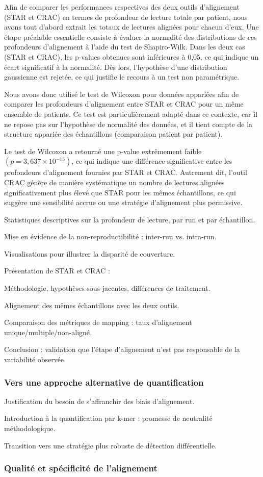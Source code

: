 Afin de comparer les performances respectives des deux outils d’alignement (STAR et CRAC) en termes de profondeur de lecture totale par patient,
 nous avons tout d’abord extrait les totaux de lectures alignées pour chacun d’eux.
Une étape préalable essentielle consiste à évaluer la normalité des distributions de ces profondeurs d’alignement à l’aide du test de Shapiro-Wilk.
 Dans les deux cas (STAR et CRAC), les p-values obtenues sont inférieures à 0,05, ce qui indique un écart significatif à la normalité. 
 Dès lors, l’hypothèse d’une distribution gaussienne est rejetée, ce qui justifie le recours à un test non paramétrique.

Nous avons donc utilisé le test de Wilcoxon pour données appariées afin de comparer les profondeurs d’alignement entre STAR et CRAC
 pour un même ensemble de patients. Ce test est particulièrement adapté dans ce contexte, car il ne repose pas sur l’hypothèse de normalité des données,
  et il tient compte de la structure appariée des échantillons (comparaison patient par patient).


Le test de Wilcoxon a retourné une p-value extrêmement faible $(p = 3,637 × 10^{-13})$, ce qui indique une différence significative entre les profondeurs d’alignement fournies par STAR et CRAC. Autrement dit, l’outil CRAC génère de manière systématique un nombre de lectures alignées significativement plus élevé que STAR pour les mêmes échantillons, ce qui suggère une sensibilité accrue ou une stratégie d’alignement plus permissive.

    Statistiques descriptives sur la profondeur de lecture, par run et par échantillon.

    Mise en évidence de la non-reproductibilité : inter-run vs. intra-run.

    Visualisations pour illustrer la disparité de couverture.


    Présentation de STAR et CRAC :

        Méthodologie, hypothèses sous-jacentes, différences de traitement.

    Alignement des mêmes échantillons avec les deux outils.

    Comparaison des métriques de mapping : taux d’alignement unique/multiple/non-aligné.

    Conclusion : validation que l’étape d’alignement n’est pas responsable de la variabilité observée.

\subsubsection{Vers une approche alternative de quantification}

    Justification du besoin de s’affranchir des biais d’alignement.

    Introduction à la quantification par k-mer : promesse de neutralité méthodologique.

    Transition vers une stratégie plus robuste de détection différentielle.

\subsubsection{Qualité et spécificité de l'alignement}

